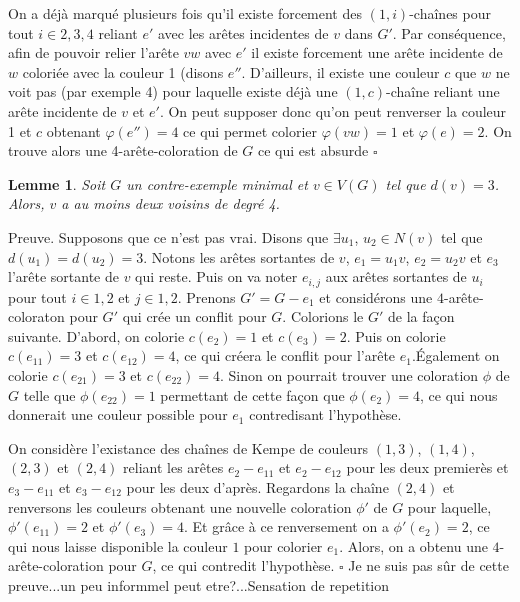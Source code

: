\documentclass[10pt,a4paper]{article}
\newtheorem{lemme}{Lemme}
\newcommand{\ep}{{\hfill $\square$}}
\begin{document}
On a déjà marqué plusieurs fois qu'il existe forcement des $(1,i)$-chaînes pour tout $i \in {2,3,4}$ reliant $e'$ avec les arêtes incidentes de $v$ dans $G'$. Par conséquence, afin de pouvoir relier l'arête $vw$ avec $e'$ il existe forcement une arête incidente de $w$ coloriée avec la couleur 1 (disons $e''$. D'ailleurs, il existe une couleur $c$ que $w$ ne voit pas (par exemple 4) pour laquelle existe déjà une $(1,c)$-chaîne reliant une arête incidente de $v$ et $e'$. On peut supposer donc qu'on peut renverser la couleur 1 et $c$ obtenant $\varphi(e'') = 4$ ce qui permet colorier $\varphi(vw) = 1$ et $\varphi(e) = 2$. On trouve alors une 4-arête-coloration de $G$ ce qui est absurde 
\ep

\begin{lemme}
Soit $G$ un contre-exemple minimal et $v \in V(G)$ tel que $d(v)=3$. Alors, $v$ a au moins deux voisins de degré 4.
\end{lemme}

Preuve.
Supposons que ce n'est pas vrai. Disons que $\exists u_1$, $u_2 \in N(v)$ tel que $d(u_1) = d(u_2) = 3$. Notons les arêtes sortantes de $v$, $e_1 = u_1v$, $e_2 = u_2v$ et $e_3$ l'arête sortante de $v$ qui reste. Puis on va noter $e_{i,j}$ aux arêtes sortantes de $u_i$ pour tout $i \in {1,2}$ et $j \in {1,2}$. Prenons $G' = G - e_1$ et considérons une $4$-arête-coloraton pour $G'$ qui crée un conflit pour $G$. Colorions le $G'$ de la façon suivante. D'abord, on colorie $c(e_2)=1$ et $c(e_3)=2$. Puis on colorie $c(e_{11})=3$ et $c(e_{12})=4$, ce qui créera le conflit pour l'arête $e_1$.Également on colorie $c(e_{21})=3$ et $c(e_{22})=4$. Sinon on pourrait trouver une coloration $\phi$ de $G$ telle que $\phi(e_{22})=1$ permettant de cette façon que $\phi(e_2)=4$, ce qui nous donnerait une couleur possible pour $e_1$ contredisant l'hypothèse.

On considère l'existance des chaînes de Kempe de couleurs $(1,3)$, $(1,4)$, $(2,3)$ et $(2,4)$ reliant les arêtes $e_2-e_{11}$ et $e_2-e_{12}$ pour les deux premierès et $e_3-e_{11}$ et $e_3-e_{12}$ pour les deux d'après. Regardons la chaîne $(2,4)$ et renversons les couleurs obtenant une nouvelle coloration $\phi'$ de $G$ pour laquelle, $\phi'(e_{11})=2$ et $\phi'(e_{3})=4$. Et grâce à ce renversement on a $\phi'(e_{2})=2$, ce qui nous laisse disponible la couleur $1$ pour colorier $e_1$. Alors, on a obtenu une $4$-arête-coloration pour $G$, ce qui contredit l'hypothèse. 
\ep
{\color{red} Je ne suis pas sûr de cette preuve...un peu informmel peut etre?...Sensation de repetition}
\end{document}

